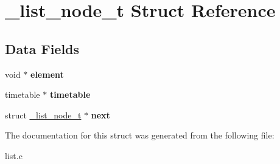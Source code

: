 \hypertarget{struct__list__node__t}{}\section{\+\_\+list\+\_\+node\+\_\+t Struct Reference}
\label{struct__list__node__t}
\subsection*{Data Fields}
\begin{DoxyCompactItemize}
\item 
\hypertarget{struct__list__node__t_abea5f5c0727c725b8f3b21f14b45abf1}{}void $\ast$ {\bfseries element}\label{struct__list__node__t_abea5f5c0727c725b8f3b21f14b45abf1}

\item 
\hypertarget{struct__list__node__t_a67b5ca2c707ab06b22a84c44582763fb}{}timetable $\ast$ {\bfseries timetable}\label{struct__list__node__t_a67b5ca2c707ab06b22a84c44582763fb}

\item 
\hypertarget{struct__list__node__t_a7e892551dbe86f632a09818435bdb459}{}struct \hyperlink{struct__list__node__t}{\+\_\+list\+\_\+node\+\_\+t} $\ast$ {\bfseries next}\label{struct__list__node__t_a7e892551dbe86f632a09818435bdb459}

\end{DoxyCompactItemize}


The documentation for this struct was generated from the following file\+:\begin{DoxyCompactItemize}
\item 
list.\+c\end{DoxyCompactItemize}
